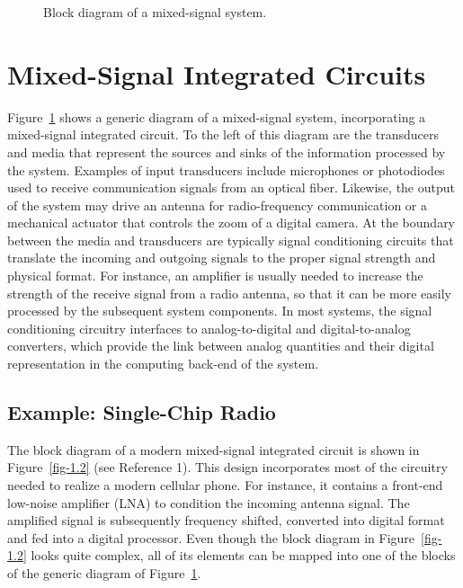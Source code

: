 \documentclass[
  11pt,
  letterpaper,
  abstract]{scrbook}
\begin{document}
\begin{figure}


\caption{\label{fig-1.1}Block diagram of a mixed-signal system.}

\end{figure}%

\section{Mixed-Signal Integrated
Circuits}\label{mixed-signal-integrated-circuits}

Figure~\ref{fig-1.1} shows a generic diagram of a mixed-signal system,
incorporating a mixed-signal integrated circuit. To the left of this
diagram are the transducers and media that represent the sources and
sinks of the information processed by the system. Examples of input
transducers include microphones or photodiodes used to receive
communication signals from an optical fiber. Likewise, the output of the
system may drive an antenna for radio-frequency communication or a
mechanical actuator that controls the zoom of a digital camera. At the
boundary between the media and transducers are typically signal
conditioning circuits that translate the incoming and outgoing signals
to the proper signal strength and physical format. For instance, an
amplifier is usually needed to increase the strength of the receive
signal from a radio antenna, so that it can be more easily processed by
the subsequent system components. In most systems, the signal
conditioning circuitry interfaces to analog-to-digital and
digital-to-analog converters, which provide the link between analog
quantities and their digital representation in the computing back-end of
the system.

\subsection{Example: Single-Chip Radio}\label{example-single-chip-radio}

The block diagram of a modern mixed-signal integrated circuit is shown
in Figure~\ref{fig-1.2} (see Reference 1). This design incorporates most
of the circuitry needed to realize a modern cellular phone. For
instance, it contains a front-end low-noise amplifier (LNA) to condition
the incoming antenna signal. The amplified signal is subsequently
frequency shifted, converted into digital format and fed into a digital
processor. Even though the block diagram in Figure~\ref{fig-1.2} looks
quite complex, all of its elements can be mapped into one of the blocks
of the generic diagram of Figure~\ref{fig-1.1}.
\end{document}
